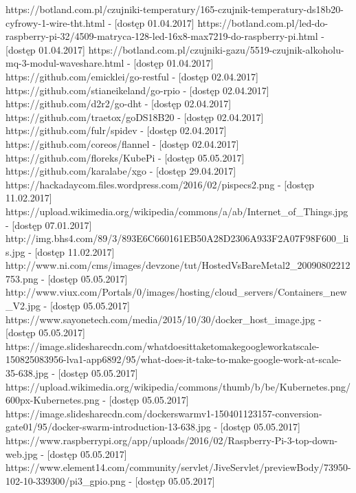 \documentclass[12pt]{report}
\begin{document}
{\begin{thebibliography}{99}
	 {https://botland.com.pl/czujniki-temperatury/165-czujnik-temperatury-ds18b20-cyfrowy-1-wire-tht.html - [dostęp 01.04.2017]}
	 {https://botland.com.pl/led-do-raspberry-pi-32/4509-matryca-128-led-16x8-max7219-do-raspberry-pi.html - [dostęp 01.04.2017]}
	 {https://botland.com.pl/czujniki-gazu/5519-czujnik-alkoholu-mq-3-modul-waveshare.html - [dostęp 01.04.2017]}
	 {https://github.com/emicklei/go-restful - [dostęp 02.04.2017]}
	 {https://github.com/stianeikeland/go-rpio - [dostęp 02.04.2017]}
	 {https://github.com/d2r2/go-dht - [dostęp 02.04.2017]}
	 {https://github.com/traetox/goDS18B20 - [dostęp 02.04.2017]}
	 {https://github.com/fulr/spidev - [dostęp 02.04.2017]}	
	 {https://github.com/coreos/flannel - [dostęp 02.04.2017]}
	 {https://github.com/floreks/KubePi - [dostęp 05.05.2017]}			 {https://github.com/karalabe/xgo - [dostęp 29.04.2017]}	
	 {https://hackadaycom.files.wordpress.com/2016/02/pispecs2.png - [dostęp 11.02.2017]}
	 {https://upload.wikimedia.org/wikipedia/commons/a/ab/Internet\_of\_Things.jpg - [dostęp 07.01.2017]}
	 {http://img.bhs4.com/89/3/893E6C660161EB50A28D2306A933F2A07F98F600\_lis.jpg - [dostęp 11.02.2017]}
	 {http://www.ni.com/cms/images/devzone/tut/HostedVsBareMetal2\_20090802212753.png - [dostęp 05.05.2017]}
	 {http://www.viux.com/Portals/0/images/hosting/cloud\_servers/Containers\_new\_V2.jpg - [dostęp 05.05.2017]}
	 {https://www.sayonetech.com/media/2015/10/30/docker\_host\_image.jpg - [dostęp 05.05.2017]}
	 {https://image.slidesharecdn.com/whatdoesittaketomakegoogleworkatscale-150825083956-lva1-app6892/95/what-does-it-take-to-make-google-work-at-scale-35-638.jpg - [dostęp 05.05.2017]}
	 {https://upload.wikimedia.org/wikipedia/commons/thumb/b/be/Kubernetes.png/600px-Kubernetes.png - [dostęp 05.05.2017]}
	 {https://image.slidesharecdn.com/dockerswarmv1-150401123157-conversion-gate01/95/docker-swarm-introduction-13-638.jpg - [dostęp 05.05.2017]}
	 {https://www.raspberrypi.org/app/uploads/2016/02/Raspberry-Pi-3-top-down-web.jpg - [dostęp 05.05.2017]}
	 {https://www.element14.com/community/servlet/JiveServlet/previewBody/73950-102-10-339300/pi3\_gpio.png - [dostęp 05.05.2017]}

\end{thebibliography}}
\end{document}
